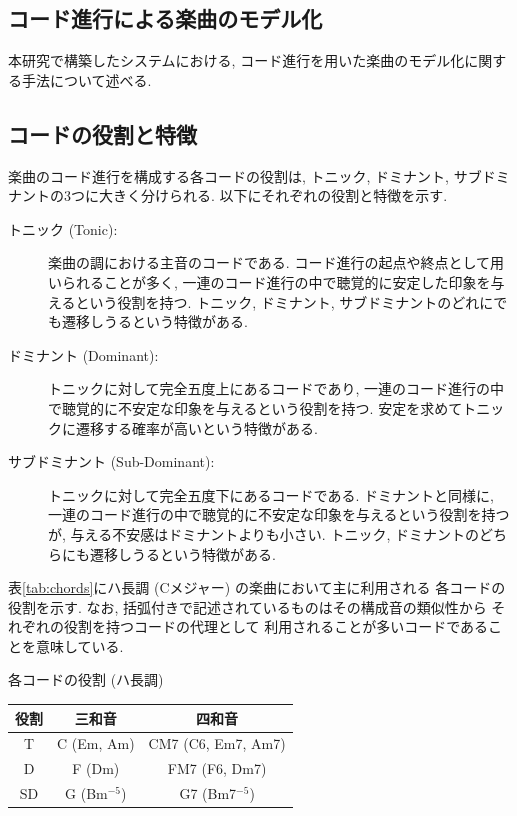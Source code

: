 \documentclass{jpreprint}
\begin{document}
\begin{multicols}{2}
\section{コード進行による楽曲のモデル化}
本研究で構築したシステムにおける,
コード進行を用いた楽曲のモデル化に関する手法について述べる.
\subsection{コードの役割と特徴}
楽曲のコード進行を構成する各コードの役割は,
トニック, ドミナント, サブドミナントの3つに大きく分けられる.
以下にそれぞれの役割と特徴を示す.
\begin{description}
  \item[トニック (Tonic):]
    楽曲の調における主音のコードである.
    コード進行の起点や終点として用いられることが多く,
    一連のコード進行の中で聴覚的に安定した印象を与えるという役割を持つ.
    トニック, ドミナント, サブドミナントのどれにでも遷移しうるという特徴がある.
  \item[ドミナント (Dominant):]
    トニックに対して完全五度上にあるコードであり,
    一連のコード進行の中で聴覚的に不安定な印象を与えるという役割を持つ.
    安定を求めてトニックに遷移する確率が高いという特徴がある.
  \item[サブドミナント (Sub-Dominant):]
    トニックに対して完全五度下にあるコードである.
    ドミナントと同様に, 
    一連のコード進行の中で聴覚的に不安定な印象を与えるという役割を持つが,
    与える不安感はドミナントよりも小さい.
    トニック, ドミナントのどちらにも遷移しうるという特徴がある.
\end{description}

表\ref{tab:chords}にハ長調 (Cメジャー) の楽曲において主に利用される
各コードの役割を示す. 
なお, 
括弧付きで記述されているものはその構成音の類似性から
それぞれの役割を持つコードの代理として
利用されることが多いコードであることを意味している.
\vspace{-0.25cm}
\begin{tablehere}
  \begin{center}
  \caption{各コードの役割 (ハ長調)}
  \label{tab:chords}
  \begin{tabular}{c|c|c}
    \hline
    \hline
    役割 & 三和音 & 四和音 \\
    \hline
    T & C (Em, Am) & CM7 (C6, Em7, Am7) \\
    D & F (Dm) & FM7 (F6, Dm7) \\
    SD & G (Bm$^{-5}$) & G7 (Bm7$^{-5}$) \\
    \hline
    \hline
  \end{tabular}
  \end{center}
\end{tablehere}


\end{multicols}
\end{document}
